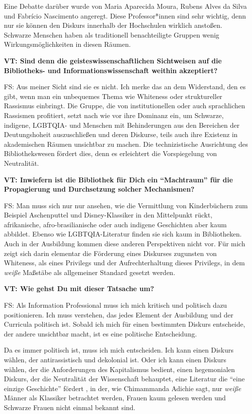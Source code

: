 \documentclass[a4paper,
fontsize=11pt,
oneside,
numbers=noperiodatend,
parskip=half-,
bibliography=totoc,
final
]{scrartcl}
\begin{document}
Eine Debatte darüber wurde von Maria Aparecida Moura, Rubens Alves da
Silva und Fabrício Nascimento angeregt. Diese Professor*innen sind sehr
wichtig, denn nur sie können den Diskurs innerhalb der Hochschulen
wirklich anstoßen. Schwarze Menschen haben als traditionell
benachteiligte Gruppen wenig Wirkungsmöglichkeiten in diesen Räumen.

\textbf{VT: Sind denn die geisteswissenschaftlichen Sichtweisen auf die
Bibliotheks- und Informationswissenschaft weithin akzeptiert?}

FS: Aus meiner Sicht sind sie es nicht. Ich merke das an dem Widerstand,
den es gibt, wenn man ein unbequemes Thema wie Whiteness oder
struktureller Rassismus einbringt. Die Gruppe, die von institutionellen
oder auch sprachlichen Rassismen profitiert, setzt nach wie vor ihre
Dominanz ein, um Schwarze, indigene, LGBTQIA- und Menschen mit
Behinderungen aus den Bereichen der Deutungshoheit auszuschließen und
deren Diskurse, teils auch ihre Existenz in akademischen Räumen
unsichtbar zu machen. Die technizistische Ausrichtung des
Bibliothekswesen fördert dies, denn es erleichtert die Vorspiegelung von
Neutralität.

\textbf{VT: Inwiefern ist die Bibliothek für Dich ein \enquote{Machtraum} für
die Propagierung und Durchsetzung solcher Mechanismen?}

FS: Man muss sich nur nur ansehen, wie die Vermittlung von Kinderbüchern
zum Beispiel Aschenputtel und Disney-Klassiker in den Mittelpunkt rückt,
afrikanische, afro-brasilianische oder auch indigene Geschichten aber
kaum abbildet. Ebenso wie LGBTQIA-Literatur finden sie sich kaum in
Bibliotheken. Auch in der Ausbildung kommen diese anderen Perspektiven
nicht vor. Für mich zeigt sich darin elementar die Förderung eines
Diskurses zugunsten von Whiteness, als eines Privilegs und der
Aufrechterhaltung dieses Privilegs, in dem \emph{weiße} Maßstäbe als
allgemeiner Standard gesetzt werden.

\textbf{VT: Wie gehst Du mit dieser Tatsache um?}

FS: Als Information Professional muss ich mich kritisch und politisch
dazu positionieren. Ich muss verstehen, das jedes Element der Ausbildung
und der Curricula politisch ist. Sobald ich mich für einen bestimmten
Diskurs entscheide, der andere unsichtbar macht, ist es eine politische
Entscheidung.

Da es immer politisch ist, muss ich mich entscheiden. Ich kann einen
Diskurs wählen, der antirassistisch und dekolonial ist. Oder ich kann
einen Diskurs wählen, der die Anforderungen des Kapitalismus bedient,
einen hegemonialen Diskurs, der die Neutralität der Wissenschaft
behauptet, eine Literatur die \enquote{eine einzige Geschichte} fördert
, in der, wie Chimammanda Adichie sagt, nur \emph{weiße} Männer als
Klassiker betrachtet werden, Frauen kaum gelesen werden und Schwarze
Frauen nicht einmal bekannt sind.
\end{document}

